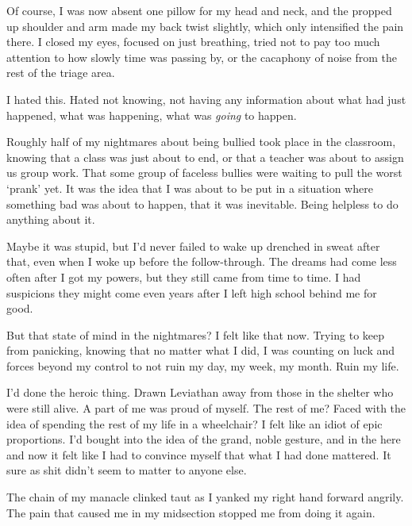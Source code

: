 Of course, I was now absent one pillow for my head and neck, and the propped up shoulder and arm made my back twist slightly, which only intensified the pain there.  I closed my eyes, focused on just breathing, tried not to pay too much attention to how slowly time was passing by, or the cacaphony of noise from the rest of the triage area.



I hated this.  Hated not knowing, not having any information about what had just happened, what was happening, what was \emph{going} to happen.



Roughly half of my nightmares about being bullied took place in the classroom, knowing that a class was just about to end, or that a teacher was about to assign us group work.  That some group of faceless bullies were waiting to pull the worst `prank' yet.  It was the idea that I was about to be put in a situation where something bad was about to happen, that it was inevitable.  Being helpless to do anything about it.



Maybe it was stupid, but I'd never failed to wake up drenched in sweat after that, even when I woke up before the follow-through.  The dreams had come less often after I got my powers, but they still came from time to time.  I had suspicions they might come even years after I left high school behind me for good.



But that state of mind in the nightmares?  I felt like that now.  Trying to keep from panicking, knowing that no matter what I did, I was counting on luck and forces beyond my control to not ruin my day, my week, my month.  Ruin my life.



I'd done the heroic thing.  Drawn Leviathan away from those in the shelter who were still alive.  A part of me was proud of myself.  The rest of me?  Faced with the idea of spending the rest of my life in a wheelchair?  I felt like an idiot of epic proportions.  I'd bought into the idea of the grand, noble gesture, and in the here and now it felt like I had to convince myself that what I had done mattered.  It sure as shit didn't seem to matter to anyone else.



The chain of my manacle clinked taut as I yanked my right hand forward angrily.  The pain that caused me in my midsection stopped me from doing it again.



